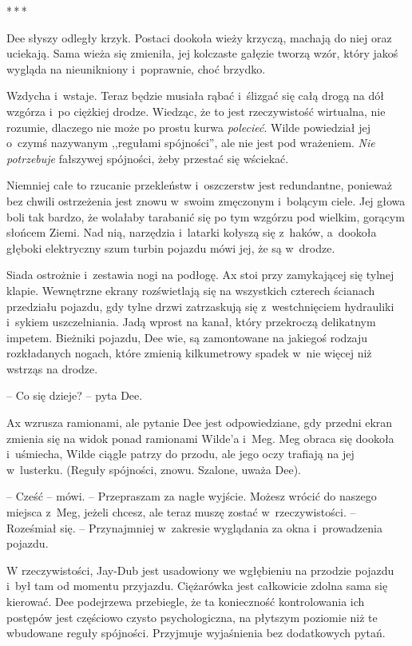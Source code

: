 \documentclass[oneside,polish,11pt,sfheadings]{mwbk}
\newcommand{\threeast}{\bigskip\par\centerline{*\,*\,*}\medskip\par}
\begin{document}
\threeast

Dee słyszy odległy krzyk. Postaci dookoła wieży krzyczą, machają do niej
oraz uciekają. Sama wieża się zmieniła, jej kolczaste gałęzie tworzą
wzór, który jakoś wygląda na nieunikniony i~poprawnie, choć brzydko.

Wzdycha i~wstaje. Teraz będzie musiała rąbać i~ślizgać się całą drogą na
dół wzgórza i~po ciężkiej drodze. Wiedząc, że to jest rzeczywistość
wirtualna, nie rozumie, dlaczego nie może po prostu kurwa
\emph{polecieć}. Wilde powiedział jej o~czymś nazywanym ,,regułami
spójności'', ale nie jest pod wrażeniem. \emph{Nie potrzebuje} fałszywej
spójności, żeby przestać się wściekać.

Niemniej całe to rzucanie przekleństw i~oszczerstw jest redundantne,
ponieważ bez chwili ostrzeżenia jest znowu w~swoim zmęczonym i~bolącym
ciele. Jej głowa boli tak bardzo, że wolałaby tarabanić się po tym
wzgórzu pod wielkim, gorącym słońcem Ziemi. Nad nią, narzędzia i~latarki
kołyszą się z~haków, a~dookoła głęboki elektryczny szum turbin pojazdu
mówi jej, że są w~drodze.

Siada ostrożnie i~zestawia nogi na podłogę. Ax stoi przy zamykającej się
tylnej klapie. Wewnętrzne ekrany rozświetlają się na wszystkich czterech
ścianach przedziału pojazdu, gdy tylne drzwi zatrzaskują się z~westchnięciem hydrauliki i~sykiem uszczelniania. Jadą wprost na kanał,
który przekroczą delikatnym impetem. Bieżniki pojazdu, Dee wie, są
zamontowane na jakiegoś rodzaju rozkładanych nogach, które zmienią
kilkumetrowy spadek w~nie więcej niż wstrząs na drodze.

-- Co się dzieje? -- pyta Dee.

Ax wzrusza ramionami, ale pytanie Dee jest odpowiedziane, gdy przedni
ekran zmienia się na widok ponad ramionami Wilde'a i~Meg. Meg obraca się
dookoła i~uśmiecha, Wilde ciągle patrzy do przodu, ale jego oczy
trafiają na jej w~lusterku. (Reguły spójności, znowu. Szalone, uważa
Dee).

-- Cześć -- mówi. -- Przepraszam za nagłe wyjście. Możesz wrócić do naszego
miejsca z~Meg, jeżeli chcesz, ale teraz muszę zostać w~rzeczywistości. -- Roześmiał się. -- Przynajmniej w~zakresie wyglądania za okna i~prowadzenia pojazdu.

W rzeczywistości, Jay-Dub jest usadowiony we wgłębieniu na przodzie
pojazdu i~był tam od momentu przyjazdu. Ciężarówka jest całkowicie
zdolna sama się kierować. Dee podejrzewa przebiegle, że ta konieczność
kontrolowania ich postępów jest częściowo czysto psychologiczna, na
płytszym poziomie niż te wbudowane reguły spójności. Przyjmuje
wyjaśnienia bez dodatkowych pytań.
\end{document}
